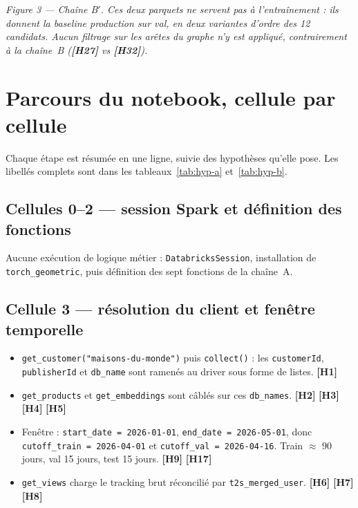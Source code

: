 \documentclass[11pt,a4paper]{article}
\newcommand{\code}[1]{\texttt{\small #1}}
\newcommand{\hyp}[1]{\textcolor{hypcol}{\textbf{\small [#1]}}}
\newcommand{\cell}[1]{\textbf{Cellule #1}}
\begin{document}
\begin{center}
\parbox{0.92\textwidth}{\footnotesize\itshape
Figure 3 --- Chaîne B$'$. Ces deux parquets ne servent pas à l'entraînement : ils
donnent la baseline production sur \emph{val}, en deux variantes d'ordre des 12
candidats. Aucun filtrage sur les arêtes du graphe n'y est appliqué, contrairement à
la chaîne~B (\hyp{H27} vs \hyp{H32}).}
\end{center}

\clearpage
\section{Parcours du notebook, cellule par cellule}

Chaque étape est résumée en une ligne, suivie des hypothèses qu'elle pose.
Les libellés complets sont dans les tableaux~\ref{tab:hyp-a} et~\ref{tab:hyp-b}.

\subsection*{Cellules 0--2 --- session Spark et définition des fonctions}
Aucune exécution de logique métier : \code{DatabricksSession}, installation de
\code{torch\_geometric}, puis définition des sept fonctions de la chaîne~A.

\subsection*{\cell{3} --- résolution du client et fenêtre temporelle}
\begin{itemize}[nosep,leftmargin=*]
  \item \code{get\_customer("maisons-du-monde")} puis \code{collect()} :
        les \code{customerId}, \code{publisherId} et \code{db\_name} sont ramenés au
        driver sous forme de listes. \hyp{H1}
  \item \code{get\_products} et \code{get\_embeddings} sont câblés sur ces
        \code{db\_names}. \hyp{H2} \hyp{H3} \hyp{H4} \hyp{H5}
  \item Fenêtre : \code{start\_date = 2026-01-01}, \code{end\_date = 2026-05-01},
        donc \code{cutoff\_train = 2026-04-01} et \code{cutoff\_val = 2026-04-16}.
        Train $\approx$ 90 jours, val 15 jours, test 15 jours. \hyp{H9} \hyp{H17}
  \item \code{get\_views} charge le tracking brut réconcilié par
        \code{t2s\_merged\_user}. \hyp{H6} \hyp{H7} \hyp{H8}
\end{itemize}
\end{document}
